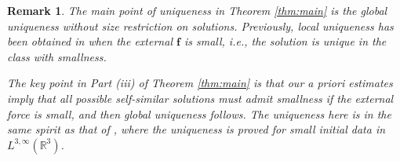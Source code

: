 \documentclass[12pt]{amsart}
\newtheorem{remark}{Remark}[section]
\newcommand{\Bf}{{\boldsymbol{f}}}
\begin{document}
	\begin{remark}
		The main point of uniqueness in Theorem \ref{thm:main} is the global uniqueness without size restriction on solutions. 
		Previously, local uniqueness has been obtained in \cite[Theorem 1.2]{Kaneko19} when the external $\Bf$ is small, i.e., the solution is unique in the class with smallness. 
		
		The key point in Part (iii) of Theorem \ref{thm:main} is that 
		our a priori estimates imply that all possible self-similar solutions must admit smallness if the external force is small, and then global uniqueness follows. The uniqueness here is in the same spirit as that of \cite{jia1409}, where the uniqueness is proved for small initial data in $L^{3,\infty}(\mathbb{R}^3)$.
	\end{remark}
	
\end{document}
